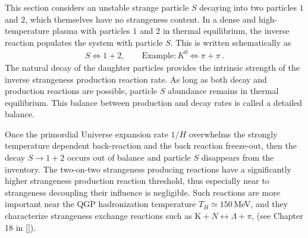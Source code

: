 This section considers an unstable strange particle $S$ decaying into two particles $1$ and $2$, which themselves have no strangeness content. In a dense and high-temperature plasma with particles $1$ and $2$ in thermal equilibrium, the inverse reaction populates the system with particle $S$. This is written schematically as
\begin{align}
 S\Longleftrightarrow1+2,\qquad \mathrm{Example}: K^0\Longleftrightarrow\pi+\pi\,.
\end{align}
The natural decay of the daughter particles provides the intrinsic strength of the inverse strangeness production reaction rate. As long as both decay and production reactions are possible, particle $S$ abundance remains in thermal equilibrium. This balance between production and decay rates is called a detailed balance.

Once the primordial Universe expansion rate $1/H$ overwhelms the strongly temperature dependent back-reaction and the back reaction freeze-out, then the decay $S\rightarrow 1+2$ occurs out of balance and particle $S$ disappears from the inventory. The two-on-two strangeness producing reactions have a significantly higher strangeness production reaction threshold, thus especially near to strangeness decoupling their influence is negligible. Such reactions are more important near the QGP hadronization temperature $T_H\simeq 150$\,MeV, and they characterize strangeness exchange reactions such as $\mathrm{K}+N\leftrightarrow \Lambda+\pi$, (see Chapter 18 in [\cite{Letessier:2002ony}]).


